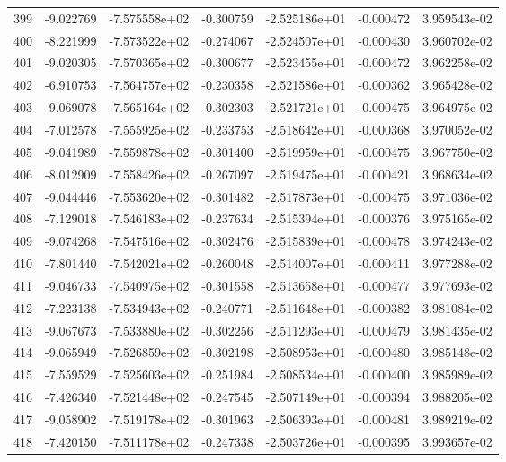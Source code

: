 \begin{tabular}{rrrrrrr}
 399 &  -9.022769 & -7.575558e+02 & -0.300759 & -2.525186e+01 &   -0.000472 &  3.959543e-02 \\
 400 &  -8.221999 & -7.573522e+02 & -0.274067 & -2.524507e+01 &   -0.000430 &  3.960702e-02 \\
 401 &  -9.020305 & -7.570365e+02 & -0.300677 & -2.523455e+01 &   -0.000472 &  3.962258e-02 \\
 402 &  -6.910753 & -7.564757e+02 & -0.230358 & -2.521586e+01 &   -0.000362 &  3.965428e-02 \\
 403 &  -9.069078 & -7.565164e+02 & -0.302303 & -2.521721e+01 &   -0.000475 &  3.964975e-02 \\
 404 &  -7.012578 & -7.555925e+02 & -0.233753 & -2.518642e+01 &   -0.000368 &  3.970052e-02 \\
 405 &  -9.041989 & -7.559878e+02 & -0.301400 & -2.519959e+01 &   -0.000475 &  3.967750e-02 \\
 406 &  -8.012909 & -7.558426e+02 & -0.267097 & -2.519475e+01 &   -0.000421 &  3.968634e-02 \\
 407 &  -9.044446 & -7.553620e+02 & -0.301482 & -2.517873e+01 &   -0.000475 &  3.971036e-02 \\
 408 &  -7.129018 & -7.546183e+02 & -0.237634 & -2.515394e+01 &   -0.000376 &  3.975165e-02 \\
 409 &  -9.074268 & -7.547516e+02 & -0.302476 & -2.515839e+01 &   -0.000478 &  3.974243e-02 \\
 410 &  -7.801440 & -7.542021e+02 & -0.260048 & -2.514007e+01 &   -0.000411 &  3.977288e-02 \\
 411 &  -9.046733 & -7.540975e+02 & -0.301558 & -2.513658e+01 &   -0.000477 &  3.977693e-02 \\
 412 &  -7.223138 & -7.534943e+02 & -0.240771 & -2.511648e+01 &   -0.000382 &  3.981084e-02 \\
 413 &  -9.067673 & -7.533880e+02 & -0.302256 & -2.511293e+01 &   -0.000479 &  3.981435e-02 \\
 414 &  -9.065949 & -7.526859e+02 & -0.302198 & -2.508953e+01 &   -0.000480 &  3.985148e-02 \\
 415 &  -7.559529 & -7.525603e+02 & -0.251984 & -2.508534e+01 &   -0.000400 &  3.985989e-02 \\
 416 &  -7.426340 & -7.521448e+02 & -0.247545 & -2.507149e+01 &   -0.000394 &  3.988205e-02 \\
 417 &  -9.058902 & -7.519178e+02 & -0.301963 & -2.506393e+01 &   -0.000481 &  3.989219e-02 \\
 418 &  -7.420150 & -7.511178e+02 & -0.247338 & -2.503726e+01 &   -0.000395 &  3.993657e-02 \\

\end{tabular}
